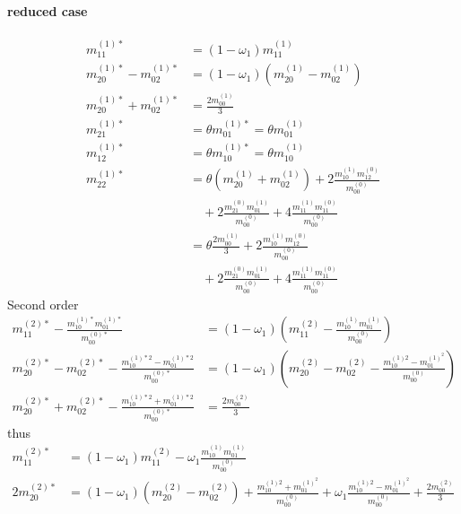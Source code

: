 \documentclass{article}
\begin{document}
  \paragraph{reduced case}
  \begin{align}
      m_{11}^{(1)*} & = (1-\omega_1) m_{11}^{(1)}  \tag{R1}
      \\
      m_{20}^{(1)*} - m_{02}^{(1)*}
        & = (1-\omega_1) (m_{20}^{(1)} - m_{02}^{(1)})  \tag{R2}
        \\
      m_{20}^{(1)*} + m_{02}^{(1)*}
        & =  \frac{2 m_{00}^{(1)}}{3}  \tag{R3}
        \\
      m_{21}^{(1)*} & = \theta m_{01}^{(1)*} = \theta m_{01}^{(1)}  \tag{R4}
      \\
      m_{12}^{(1)*} & = \theta m_{10}^{(1)*} = \theta m_{10}^{(1)}  \tag{R5}
      \\
      m_{22}^{(1)*} & =  \theta (m_{20}^{(1)} + m_{02}^{(1)}) \tag{R6}
        + 2\frac{ m_{10}^{(1)} m_{12}^{(0)} }{m_{00}^{(0)}}
        \\\nonumber&\quad
        + 2\frac{ m_{21}^{(0)} m_{01}^{(1)} }{m_{00}^{(0)}}
        + 4\frac{ m_{11}^{(1)} m_{11}^{(0)} }{m_{00}^{(0)}}
        \\\nonumber&= \theta \frac{2 m_{00}^{(1)}}{3} + 2\frac{ m_{10}^{(1)} m_{12}^{(0)} }{m_{00}^{(0)}}
        \\\nonumber&\quad
        + 2\frac{ m_{21}^{(0)} m_{01}^{(1)} }{m_{00}^{(0)}}
        + 4\frac{ m_{11}^{(1)} m_{11}^{(0)} }{m_{00}^{(0)}}
  \end{align}
Second order
  \begin{align}
      m_{11}^{(2)*} - \frac{ m_{10}^{(1)*}m_{01}^{(1)*}}{m_{00}^{(0)*}} & = (1-\omega_1)\left(m_{11}^{(2)} - \frac{ m_{10}^{(1)}m_{01}^{(1)}}{m_{00}^{(0)}}\right)  \tag{R7}
      \\
      m_{20}^{(2)*}-m_{02}^{(2)*} - \frac{ m_{10}^{(1)*2} - m_{01}^{(1)*2}}{m_{00}^{(0)*}}
      & = (1-\omega_1) \left(m_{20}^{(2)}-m_{02}^{(2)} - \frac{ m_{10}^{(1)2} - m_{01}^{{(1)}^2}}{m_{00}^{(0)}}\right)  \tag{R8}
      \\
      m_{20}^{(2)*}+m_{02}^{(2)*} - \frac{ m_{10}^{(1)*2} + m_{01}^{(1)*2}}{m_{00}^{(0)*}} & = \frac{2 m_{00}^{(2)}}{3} \tag{R9}
  \end{align}
  thus
  \begin{align}
      m_{11}^{(2)*} & = (1-\omega_1)m_{11}^{(2)} - \omega_1\frac{ m_{10}^{(1)}m_{01}^{(1)}}{m_{00}^{(0)}} \tag{R10}
      \\
      2m_{20}^{(2)*} & = (1-\omega_1) \left(m_{20}^{(2)}-m_{02}^{(2)}\right)
      + \frac{ m_{10}^{(1)2} + m_{01}^{{(1)}^2}}{m_{00}^{(0)}} + \omega_1 \frac{ m_{10}^{(1)2} - m_{01}^{{(1)}^2}}{m_{00}^{(0)}}
      + \frac{2 m_{00}^{(2)}}{3}  \tag{R11}
  \end{align}
\end{document}
